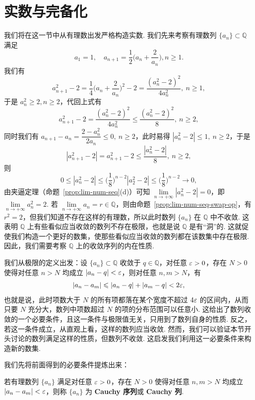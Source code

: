 \documentclass[../main.tex]{subfiles}
\begin{document}
\section{实数与完备化} \label{sec:1.3}

我们将在这一节中从有理数出发严格构造实数. 我们先来考察有理数列 $\{a_n\} \subset \mathbb Q$ 满足 
$$
a_1 = 1,\quad a_{n + 1} = \dfrac{1}{2} \bigg( a_n + \dfrac{2}{a_n} \bigg), n \geqslant 1. 
$$
我们有 
$$
a_{n + 1}^2 - 2 = \dfrac{1}{4} \bigg( a_n + \dfrac{2}{a_n} \bigg)^2 - 2 = \dfrac{(a_n^2 - 2)^2}{4a_n^2},\ n \geqslant 1, 
$$
于是 $a_n^2 \geqslant 2, n \geqslant 2$，代回上式有
$$
a_{n + 1}^2 - 2 = \dfrac{(a_n^2 - 2)^2}{4a_n^2} \leqslant \dfrac{(a_n^2 - 2)^2}{8},\ n \geqslant 2, 
$$
同时我们有 $a_{n + 1} - a_n = \dfrac{2 - a_n^2}{2a_n} \leqslant 0,\ n \geqslant 2$，此时易得 $|a_n^2 - 2| \leqslant 1,\ n \geqslant 2$，于是
$$
|a_{n + 1}^2 - 2| = a_{n + 1}^2 - 2 \leqslant \dfrac{|a_n^2 - 2|}{8},\ n \geqslant 2, 
$$
则 $$
0 \leqslant |a_n^2 - 2| \leqslant \bigg(\dfrac{1}{8}\bigg)^{n - 2} |a_2^2 - 2| \leqslant \bigg(\dfrac{1}{8}\bigg)^{n - 2} \to 0, 
$$
由夹逼定理（命题~\ref{prop:lim-num-seq}(d)）可知 $\lim\limits_{n \to +\infty} |a_n^2 - 2| = 0$，即 $\lim\limits_{n \to +\infty} a_n^2 = 2$. 若 $\lim\limits_{n \to +\infty} a_n = r \in \mathbb Q$，则由命题~\ref{prop:lim-num-seq-swap-op}，有 $r^2 = 2$，但我们知道不存在这样的有理数，所以此时数列 $\{a_n\}$ 在 $\mathbb Q$ 中不收敛. 这表明 $\mathbb Q$ 上有些看似应当收敛的数列不存在极限，也就是说 $\mathbb Q$ 是有“洞”的. 这就促使我们构造一个更好的数集，使那些看似应当收敛的数列都在该数集中存在极限. 因此，我们需要考察 $\mathbb Q$ 上的收敛序列的内在性质. 

我们从极限的定义出发：设 $\{a_n\} \subset \mathbb Q$ 收敛于 $q \in \mathbb Q$，对任意 $\varepsilon > 0$，存在 $N > 0$ 使得对任意 $n > N$ 均成立 $|a_n - q| < \varepsilon$，则对任意 $n, m > N$，有 
$$
|a_n - a_m| \leqslant |a_n - q| + |a_m - q| < 2\varepsilon, 
$$
也就是说，此时项数大于 $N$ 的所有项都落在某个宽度不超过 $4\varepsilon$ 的区间内，从而只要 $N$ 充分大，数列中项数超过 $N$ 的项的分布范围可以任意小. 这给出了数列收敛的一个必要条件，且这一条件与极限值无关，只用到了数列自身的性质. 反之，若这一条件成立，从直观上看，这样的数列应当收敛. 然而，我们可以验证本节开头讨论的数列满足这样的性质，但数列不收敛. 这启发我们利用这一必要条件来构造新的数集. 

我们先将前面得到的必要条件提炼出来：

\begin{definition} \label{def:Cauchy-seq-Q}
    若有理数列 $\{a_n\}$ 满足对任意 $\varepsilon > 0$，存在 $N > 0$ 使得对任意 $n, m > N$ 均成立 $|a_n - a_m| < \varepsilon$，则称 $\{a_n\}$ 为 \textbf{Cauchy 序列}或 \textbf{Cauchy 列}. 
\end{definition}
\end{document}
